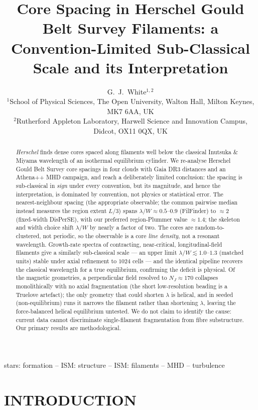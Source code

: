 \documentclass[usenatbib,twoside,twocolumn]{mnras}
\title{Core Spacing in Herschel Gould Belt Survey Filaments: a Convention-Limited Sub-Classical Scale and its Interpretation}
\author[G.~J.~White]{G.~J.~White$^{1,2}$\\
$^{1}$School of Physical Sciences, The Open University, Walton Hall, Milton Keynes, MK7 6AA, UK\\
$^{2}$Rutherford Appleton Laboratory, Harwell Science and Innovation Campus, Didcot, OX11 0QX, UK}
\begin{document}
\maketitle

\begin{abstract}
\textit{Herschel} finds dense cores spaced along filaments well below the classical Inutsuka \& Miyama wavelength of an isothermal equilibrium cylinder. We re-analyse Herschel Gould Belt Survey core spacings in four clouds with Gaia DR3 distances and an Athena++ MHD campaign, and reach a deliberately limited conclusion: the spacing is sub-classical in \emph{sign} under every convention, but its magnitude, and hence the interpretation, is dominated by convention, not physics or statistical error. The nearest-neighbour spacing (the appropriate observable; the common pairwise median instead measures the region extent $L/3$) spans $\lambda/W\approx0.5$--$0.9$ (FilFinder) to $\approx2$ (fixed-width DisPerSE), with our preferred region-Plummer value $\approx1.4$; the skeleton and width choice shift $\lambda/W$ by nearly a factor of two. The cores are random-to-clustered, not periodic, so the observable is a core \emph{line density}, not a resonant wavelength. Growth-rate spectra of contracting, near-critical, longitudinal-field filaments give a similarly sub-classical scale --- an upper limit $\lambda/W\lesssim1.0$--$1.3$ (matched units) stable under axial refinement to $1024$ cells --- and the identical pipeline recovers the classical wavelength for a true equilibrium, confirming the deficit is physical. Of the magnetic geometries, a perpendicular field resolved to $N_J\approx170$ collapses monolithically with no axial fragmentation (the short low-resolution beading is a Truelove artefact); the only geometry that could shorten $\lambda$ is helical, and in seeded (non-equilibrium) runs it narrows the filament rather than shortening $\lambda$, leaving the force-balanced helical equilibrium untested. We do not claim to identify the cause: current data cannot discriminate single-filament fragmentation from fibre substructure. Our primary results are methodological.
\end{abstract}


\begin{keywords}
stars: formation -- ISM: structure -- ISM: filaments -- MHD -- turbulence
\end{keywords}

\section{INTRODUCTION}
\end{document}
